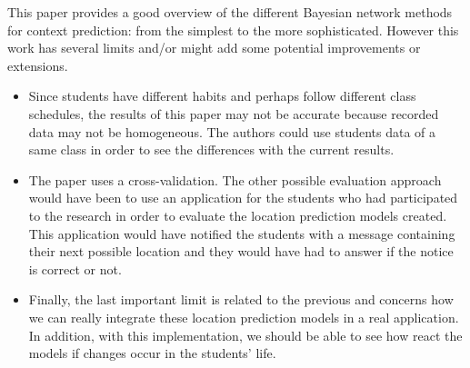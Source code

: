 This paper provides a good overview of the different Bayesian network methods for context prediction: from the simplest to the more sophisticated. However this work has several limits and/or might add some potential improvements or extensions.

\begin{itemize}

\item Since students have different habits and perhaps follow different class schedules, the results of this paper may not be accurate because recorded data may not be homogeneous. The authors could use students data of a same class in order to see the differences with the current results.

\item The paper uses a cross-validation. The other possible evaluation approach would have been to use an application for the students who had participated to the research in order to evaluate the location prediction models created. This application would have notified the students with a message containing their next possible location and they would have had to answer if the notice is correct or not.

\item Finally, the last important limit is related to the previous and concerns how we can really integrate these location prediction models in a real application. In addition, with this implementation, we should be able to see how react the models if changes occur in the students' life.

\end{itemize}